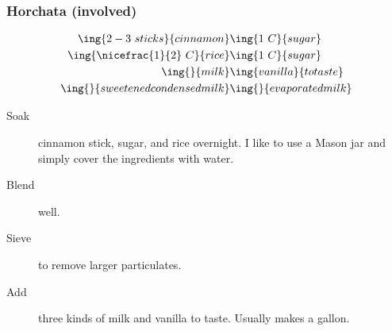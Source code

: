 \subsubsection{Horchata (involved)}

\begin{align*}
    \ing{2-3~sticks}{cinnamon}       & \ing{1~C}{sugar}        \\
    \ing{\nicefrac{1}{2}~C}{rice}    & \ing{1~C}{sugar}        \\
    \ing{}{milk}                     & \ing{vanilla}{to taste} \\
    \ing{}{sweetened condensed milk} & \ing{}{evaporated milk}
\end{align*}

\begin{description}
    \item[Soak]cinnamon stick, sugar, and rice overnight. I like to use a Mason jar and simply cover the ingredients with water.
    \item[Blend]well.
    \item[Sieve]to remove larger particulates.
    \item[Add]three kinds of milk and vanilla to taste. Usually makes a gallon.
\end{description}

\pagebreak
